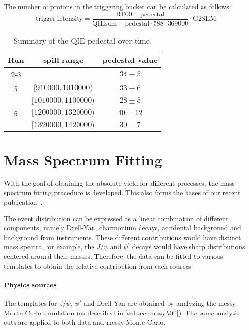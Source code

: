 \documentclass[../main.tex]{subfiles}
\begin{document}
The number of protons in the triggering bucket can be calculated as follows:
\begin{equation}
	\mathrm{trigger\ intensity} = \frac{\mathrm{RF00}-\mathrm{pedestal}}{\mathrm{QIEsum}-\mathrm{pedestal}\cdot 588\cdot 369000}\cdot \mathrm{G2SEM}
\end{equation}
\begin{table}[h!]
	\centering
	\caption{Summary of the QIE pedestal over time\cite{kenichi-9289}.}
	\label{tabel:pedestal}
	\begin{tabular}{|c|c|c|}
		\hline
		Run & spill range                     & pedestal value \\ \hline
		2-3 &                                 & $34\pm5$       \\ \hline
		5   & $[\num{910000},\num{1010000})$  & $33\pm 6$      \\ \cline{2-3}
		    & $[\num{1010000},\num{1100000})$ & $28\pm 5$      \\ \hline
		6   & $[\num{1200000},\num{1320000})$ & $40\pm 12$     \\ \cline{2-3}
		    & $[\num{1320000},\num{1420000})$ & $30\pm 7$      \\ \hline
	\end{tabular}
\end{table}

\section{Mass Spectrum Fitting}
\label{sec:massfit_procedure}
With the goal of obtaining the absolute yield for different processes, the mass spectrum fitting
procedure is developed. This also forms the bases of our recent publication~\cite{dove2023}.

The event distribution can be expressed as a linear combination of different components,
namely Drell-Yan, charmonium decays, accidental background and background from instruments.
These different contributions would have distinct mass spectra, for example, the $J/\psi$
and $\psi^\prime$ decays would have sharp distributions centered around their masses.
Therefore, the data can be fitted to various templates to obtain
the relative contribution from each sources.

\paragraph{Physics sources}
The templates for $J/\psi$, $\psi'$ and Drell-Yan are obtained by analyzing the messy Monte Carlo
simulation (as described in \cref{subsec:messyMC}). The same analysis cuts are applied to both data
and messy Monte Carlo.
\end{document}
